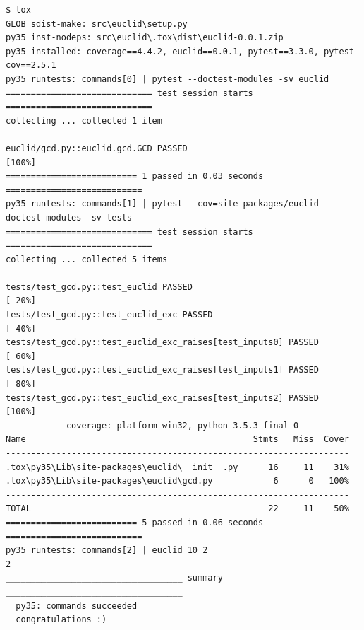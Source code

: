 \documentclass{beamer} %
\begin{document}
\begin{frame}[fragile]
\begin{tiny}
\begin{verbatim}
$ tox
GLOB sdist-make: src\euclid\setup.py
py35 inst-nodeps: src\euclid\.tox\dist\euclid-0.0.1.zip
py35 installed: coverage==4.4.2, euclid==0.0.1, pytest==3.3.0, pytest-cov==2.5.1
py35 runtests: commands[0] | pytest --doctest-modules -sv euclid
============================= test session starts =============================
collecting ... collected 1 item

euclid/gcd.py::euclid.gcd.GCD PASSED                                     [100%]
========================== 1 passed in 0.03 seconds ===========================
py35 runtests: commands[1] | pytest --cov=site-packages/euclid --doctest-modules -sv tests
============================= test session starts =============================
collecting ... collected 5 items

tests/test_gcd.py::test_euclid PASSED                                    [ 20%]
tests/test_gcd.py::test_euclid_exc PASSED                                [ 40%]
tests/test_gcd.py::test_euclid_exc_raises[test_inputs0] PASSED           [ 60%]
tests/test_gcd.py::test_euclid_exc_raises[test_inputs1] PASSED           [ 80%]
tests/test_gcd.py::test_euclid_exc_raises[test_inputs2] PASSED           [100%]
----------- coverage: platform win32, python 3.5.3-final-0 -----------
Name                                             Stmts   Miss  Cover
--------------------------------------------------------------------
.tox\py35\Lib\site-packages\euclid\__init__.py      16     11    31%
.tox\py35\Lib\site-packages\euclid\gcd.py            6      0   100%
--------------------------------------------------------------------
TOTAL                                               22     11    50%
========================== 5 passed in 0.06 seconds ===========================
py35 runtests: commands[2] | euclid 10 2
2
___________________________________ summary ___________________________________
  py35: commands succeeded
  congratulations :)
\end{verbatim}
\end{tiny}

\end{frame}
\end{document}
